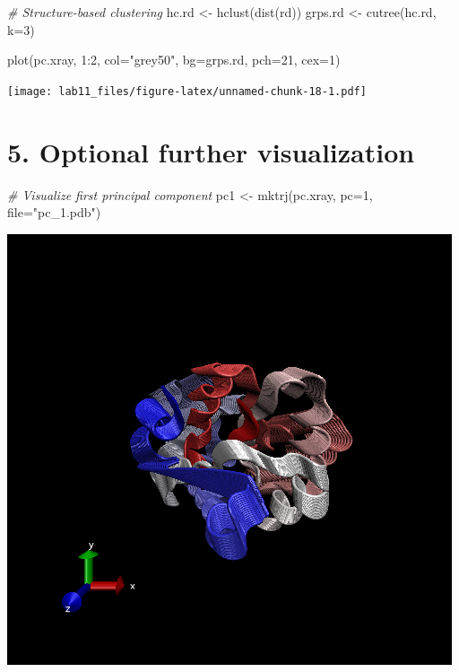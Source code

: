 \documentclass[
]{article}
\newenvironment{Shaded}{\begin{snugshade}}{\end{snugshade}}
\newcommand{\AttributeTok}[1]{\textcolor[rgb]{0.77,0.63,0.00}{#1}}
\newcommand{\CommentTok}[1]{\textcolor[rgb]{0.56,0.35,0.01}{\textit{#1}}}
\newcommand{\DecValTok}[1]{\textcolor[rgb]{0.00,0.00,0.81}{#1}}
\newcommand{\FunctionTok}[1]{\textcolor[rgb]{0.00,0.00,0.00}{#1}}
\newcommand{\NormalTok}[1]{#1}
\newcommand{\OtherTok}[1]{\textcolor[rgb]{0.56,0.35,0.01}{#1}}
\newcommand{\SpecialCharTok}[1]{\textcolor[rgb]{0.00,0.00,0.00}{#1}}
\newcommand{\StringTok}[1]{\textcolor[rgb]{0.31,0.60,0.02}{#1}}
\begin{document}
\begin{Shaded}
\begin{Highlighting}[]
\CommentTok{\# Structure{-}based clustering}
\NormalTok{hc.rd }\OtherTok{\textless{}{-}} \FunctionTok{hclust}\NormalTok{(}\FunctionTok{dist}\NormalTok{(rd))}
\NormalTok{grps.rd }\OtherTok{\textless{}{-}} \FunctionTok{cutree}\NormalTok{(hc.rd, }\AttributeTok{k=}\DecValTok{3}\NormalTok{)}

\FunctionTok{plot}\NormalTok{(pc.xray, }\DecValTok{1}\SpecialCharTok{:}\DecValTok{2}\NormalTok{, }\AttributeTok{col=}\StringTok{"grey50"}\NormalTok{, }\AttributeTok{bg=}\NormalTok{grps.rd, }\AttributeTok{pch=}\DecValTok{21}\NormalTok{, }\AttributeTok{cex=}\DecValTok{1}\NormalTok{)}
\end{Highlighting}
\end{Shaded}

\texttt{[image: lab11\_files/figure-latex/unnamed-chunk-18-1.pdf]}

\hypertarget{optional-further-visualization}{%
\section{5. Optional further
visualization}\label{optional-further-visualization}}

\begin{Shaded}
\begin{Highlighting}[]
\CommentTok{\# Visualize first principal component}
\NormalTok{pc1 }\OtherTok{\textless{}{-}} \FunctionTok{mktrj}\NormalTok{(pc.xray, }\AttributeTok{pc=}\DecValTok{1}\NormalTok{, }\AttributeTok{file=}\StringTok{"pc\_1.pdb"}\NormalTok{)}
\end{Highlighting}
\end{Shaded}

\includegraphics{1AKE_A image.png}
\end{document}
